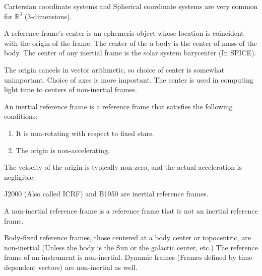 \documentclass[crop=false,class=book]{standalone}
\begin{document}
\begin{example}
Cartersian coordinate systems and Spherical coordinate systems are very common for $\mathbb{R}^3$ (3-dimensions).
\end{example}
\begin{remark}
A reference frame's center is an ephemeris object whose location is coincident with the origin of the frame. The center of the a body is the center of mass of the body. The center of any inertial frame is the solar system barycenter (In SPICE).
\end{remark}
The origin cancels in vector arithmetic, so choice of center is somewhat unimportant. Choice of axes is more important. The center is used in computing light time to centers of non-inertial frames.
\begin{definition}
An inertial reference frame is a reference frame that satisfies the following conditions:
\begin{enumerate}
    \item It is non-rotating with respect to fixed stars.
    \item The origin is non-accelerating.
\end{enumerate}
\end{definition}
\begin{remark}
The velocity of the origin is typically non-zero, and the actual acceleration is negligible.
\end{remark}
\begin{example}
J2000 (Also called ICRF) and B1950 are inertial reference frames.
\end{example}
\begin{definition}
A non-inertial reference frame is a reference frame that is not an inertial reference frame.
\end{definition}
\begin{example}
Body-fixed reference frames, those centered at a body center or topocentric, are non-inertial (Unless the body is the Sun or the galactic center, etc.) The reference frame of an instrument is non-inertial. Dynamic frames (Frames defined by time-dependent vectors) are non-inertial as well.
\end{example}
\end{document}
